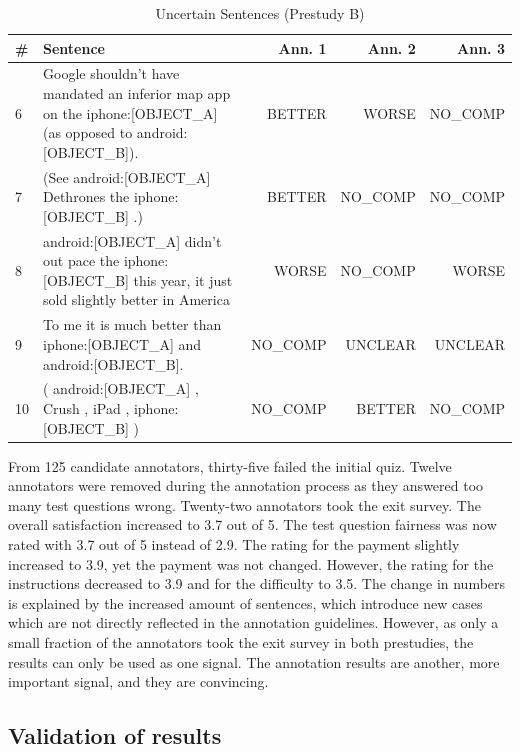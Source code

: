 \begin{table}[h]
\centering
\caption{Uncertain Sentences (Prestudy B)}
\label{tbl:pre_1_res}
\begin{tabularx}{\textwidth}{lXrrr}
\toprule
\# & Sentence        & Ann. 1  & Ann. 2 & Ann. 3             \\ \midrule
6 & Google shouldn't have mandated an inferior map app on the iphone:[OBJECT\_A] (as opposed to android:[OBJECT\_B]). & BETTER & WORSE & NO\_COMP \\
7 & (See android:[OBJECT\_A] Dethrones the iphone:[OBJECT\_B] .) & BETTER & NO\_COMP & NO\_COMP \\
8 & android:[OBJECT\_A] didn't out pace the iphone:[OBJECT\_B] this year, it just sold slightly better in America & WORSE & NO\_COMP & WORSE\\
9 & To me it is much better than iphone:[OBJECT\_A] and android:[OBJECT\_B]. & NO\_COMP & UNCLEAR & UNCLEAR \\
10 & ( android:[OBJECT\_A] , Crush , iPad , iphone:[OBJECT\_B] )& NO\_COMP & BETTER & NO\_COMP \\

\bottomrule                              
\end{tabularx}
\end{table}


From 125 candidate annotators, thirty-five failed the initial quiz. Twelve annotators were removed during the annotation process as they answered too many test questions wrong.
Twenty-two annotators took the exit survey. The overall satisfaction increased to 3.7 out of 5. The test question fairness was now rated with 3.7 out of 5 instead of 2.9. The rating for the payment slightly increased to 3.9, yet the payment was not changed. However, the rating for the instructions decreased to 3.9 and for the difficulty to 3.5.
The change in numbers is explained by the increased amount of sentences, which introduce new cases which are not directly reflected in the annotation guidelines. However, as only a small fraction of the annotators took the exit survey in both prestudies, the results can only be used as one signal. The annotation results are another, more important signal, and they are convincing.

\subsection{Validation of results}

